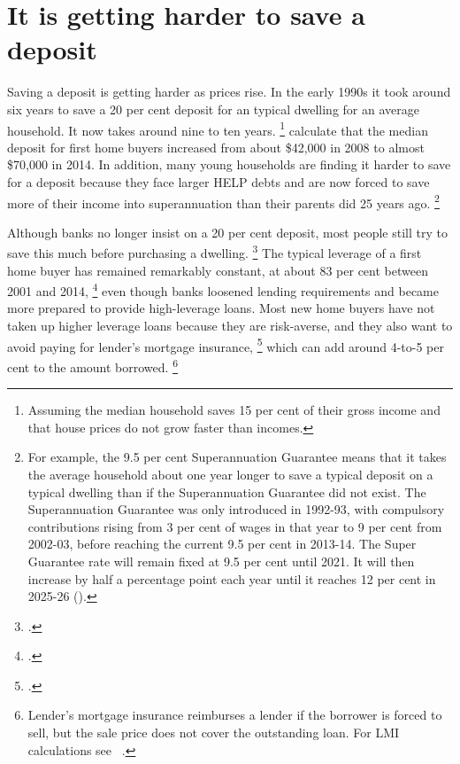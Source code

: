 \section{It is getting harder to save a deposit}\label{sec:it-is-getting-harder-to-save-for-a-deposit}
Saving a deposit is getting harder as prices rise.
In the early 1990s it took around six years to save a 20 per cent deposit for an typical dwelling for an average household.
It now takes around nine to ten years.%
	\footnote{Assuming the median household saves 15 per cent of their gross income and that house prices do not grow faster than incomes.}
\textcite{Simon-Stone-2017-Property-Ladder} calculate that the median deposit for first home buyers increased from about  \$42,000 in 2008 to almost \$70,000 in 2014.
In addition, many young households are finding it harder to save for a deposit because they face larger HELP debts and are now forced to save more of their income into superannuation than their parents did 25 years ago.%
	\footnote{For example, the 9.5 per cent Superannuation Guarantee means that it takes the average household about one year longer to save a typical deposit on a typical dwelling than if the Superannuation Guarantee did not exist. The Superannuation Guarantee was only introduced in 1992-93, with compulsory contributions rising from 3 per cent of wages in that year to 9 per cent from 2002-03, before reaching the current 9.5 per cent in 2013-14. The Super Guarantee rate will remain fixed at 9.5 per cent until 2021. It will then increase by half a percentage point each year until it reaches 12 per cent in 2025-26 (\textcite[][12]{DaleyCoatesWood-2015-Super-tax-targeting}).}

Although banks no longer insist on a 20 per cent deposit, most people still try to save this much before purchasing a dwelling.%
	\footcite{Ellis-2017-Speech-Aust-Housing-Researchers}
The typical leverage of a first home buyer has remained remarkably constant, at about 83 per cent between 2001 and 2014,%
	\footcite{Simon-Stone-2017-Property-Ladder}
even though banks loosened lending requirements and became more prepared to provide high-leverage loans.
Most new home buyers have not taken up higher leverage loans because they are risk-averse, and they also want to avoid paying for lender's mortgage insurance,%
	\footcites{Ellis2013-Housing-Mortgage-Markets-speech}{Simon-Stone-2017-Property-Ladder}
which can add around 4-to-5 per cent to the amount borrowed.%
	\footnote{Lender's mortgage insurance reimburses a lender if the borrower is forced to sell, but the sale price does not cover the outstanding loan.
	For LMI calculations see \eg~\textcite{Thelander-2017-Canstar-What-is-LMI}.}

